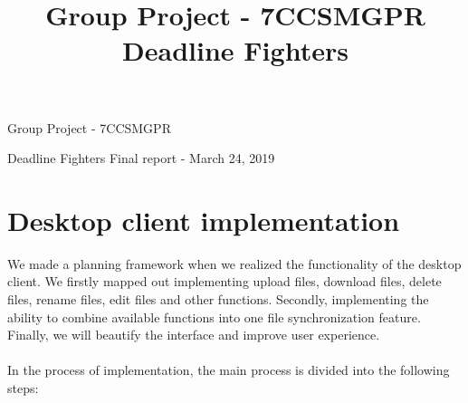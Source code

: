 \documentclass[a4paper]{article}
\title{Group Project - 7CCSMGPR \hspace{0.5 cm}Deadline Fighters}
\begin{document}
{
\begin{center}
		\LARGE{Group Project - 7CCSMGPR}
\end{center}
\begin{center}
		\hspace{0.5cm} Deadline Fighters \hspace{0.5 cm} Final report - March 24, 2019
\end{center}


\section{Desktop client implementation}
We made a planning framework when we realized the functionality of the desktop client. We firstly mapped out implementing upload files, download files, delete files, rename files, edit files and other functions. Secondly, implementing the ability to combine available functions into one file synchronization feature. Finally, we will beautify the interface and improve user experience.\\\\
In the process of implementation, the main process is divided into the following steps:\\\\




}
\end{document}
